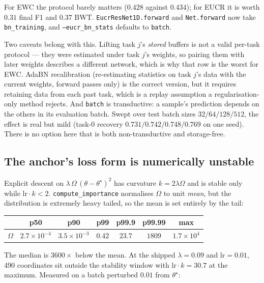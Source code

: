 \documentclass{article}
\begin{document}
For EWC the protocol barely matters ($0.428$ against $0.434$); for EUCR it is
worth $0.31$ final F1 and $0.37$ BWT. \texttt{EucrResNet1D.forward} and
\texttt{Net.forward} now take \texttt{bn\_training}, and
\texttt{--eucr\_bn\_stats} defaults to \texttt{batch}.

Two caveats belong with this. Lifting task $j$'s \emph{stored} buffers is not a
valid per-task protocol --- they were estimated under task $j$'s weights, so
pairing them with later weights describes a different network, which is why that
row is the worst for EWC. AdaBN recalibration (re-estimating statistics on task
$j$'s data with the current weights, forward passes only) is the correct version,
but it requires retaining data from each past task, which is a replay assumption
a regularisation-only method rejects. And \texttt{batch} is transductive: a
sample's prediction depends on the others in its evaluation batch. Swept over
test batch sizes $32/64/128/512$, the effect is real but mild (task-0 recovery
$0.731/0.742/0.748/0.769$ on one seed). There is no option here that is both
non-transductive and storage-free.

\subsection{The anchor's loss form is numerically unstable}
\label{sec:anchor}

Explicit descent on $\lambda\,\Omega\,(\theta-\theta^\star)^2$ has curvature
$k = 2\lambda\Omega$ and is stable only while $\mathrm{lr}\cdot k < 2$.
\texttt{compute\_importance} normalises $\Omega$ to unit \emph{mean}, but the
distribution is extremely heavy tailed, so the mean is set entirely by the tail:

\begin{center}
\begin{tabular}{lcccccc}
\toprule
 & p50 & p90 & p99 & p99.9 & p99.99 & max \\
\midrule
$\Omega$ & $2.7\times10^{-4}$ & $3.5\times10^{-3}$ & $0.42$ & $23.7$ & $1809$ & $1.7\times10^{4}$ \\
\bottomrule
\end{tabular}
\end{center}

The median is $3600\times$ below the mean. At the shipped $\lambda=0.09$ and
$\mathrm{lr}=0.01$, 490 coordinates sit outside the stability window with
$\mathrm{lr}\cdot k = 30.7$ at the maximum. Measured on a batch perturbed
$0.01$ from $\theta^\star$:
\end{document}
